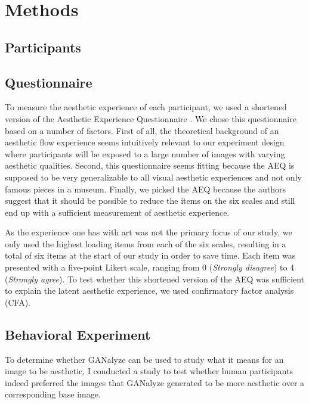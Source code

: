 \documentclass[../main.tex]{subfiles}
\begin{document}
\section{Methods}
	
	\subsection{Participants}
	
	
	\subsection{Questionnaire}
	To measure the aesthetic experience of each participant, we used a shortened version of the Aesthetic Experience Questionnaire \parencite[AEQ;][]{wanzerExperiencingFlowViewing2020}. We chose this questionnaire based on a number of factors. First of all, the theoretical background of an aesthetic flow experience \parencite{csikszentmihalyi1990art} seems intuitively relevant to our experiment design where participants will be exposed to a large number of images with varying aesthetic qualities. Second, this questionnaire seems fitting because the AEQ is supposed to be very generalizable to all visual aesthetic experiences and not only famous pieces in a museum. Finally, we picked the AEQ because the authors suggest that it should be possible to reduce the items on the six scales and still end up with a sufficient measurement of aesthetic experience.
	
	As the experience one has with art was not the primary focus of our study, we only used the highest loading items from each of the six scales, resulting in a total of six items at the start of our study in order to save time. Each item was presented with a five-point Likert scale, ranging from 0 (\textit{Strongly disagree}) to 4 (\textit{Strongly agree}). To test whether this shortened version of the AEQ was sufficient to explain the latent aesthetic experience, we used confirmatory factor analysis (CFA).
	
	
	
	\subsection{Behavioral Experiment}
	To determine whether GANalyze \parencite{goetschalckxGANalyzeVisualDefinitions2019} can be used to study what it means for an image to be aesthetic, I conducted a study to test whether human participants indeed preferred the images that GANalyze generated to be more aesthetic over a corresponding base image.
	
\end{document}
